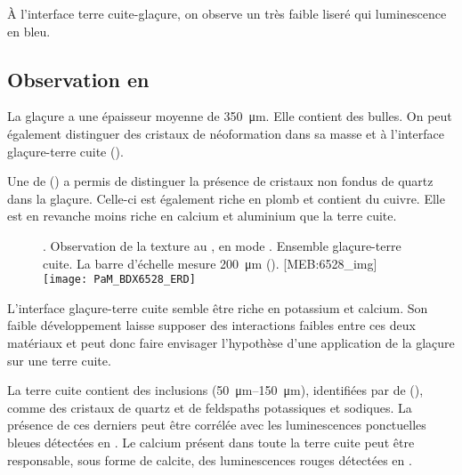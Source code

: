À l'interface terre cuite-glaçure, on observe un très faible liseré 
qui luminescence en bleu.

\subsection{Observation en \MEB[ie]}
La glaçure a une épaisseur moyenne de \SI{350}{\um}. Elle contient des 
bulles. On peut également distinguer des cristaux de néoformation dans 
sa masse et à l'interface glaçure-terre cuite 
().

Une \carto de \RX () a permis de distinguer 
la présence de cristaux non fondus de quartz dans la glaçure. Celle-ci 
est également riche en plomb et contient du cuivre. Elle est en 
revanche moins riche en calcium et aluminium que la terre cuite.

\begin{figure}[p]
  \setlength{\imgwidth}{7cm}
  \setlength{\mylength}{1cm+\imgwidth}
  \setlength{\sidecapwidth}{\linewidth-\sidecapsep-\mylength-1cm}
  \renewcommand*{\sidecapfloatwidth}{\mylength}%
  \RaggedLeft
  \begin{sidecaption}{%
    \legendeA.
    Observation de la texture au \MEB, en mode \ERD. 
    Ensemble glaçure-terre cuite. La barre d'échelle mesure 
    \SI{200}{\um} ().%
  }[MEB:6528_img]
    \texttt{[image: PaM\_BDX6528\_ERD]}%
  \end{sidecaption}
\end{figure}

L'interface glaçure-terre cuite semble être riche en potassium et 
calcium. Son faible développement laisse supposer des interactions 
faibles entre ces deux matériaux  et peut donc faire envisager 
l'hypothèse d'une application de la glaçure sur une terre cuite.

La terre cuite contient des inclusions 
(\SIrange[range-phrase=\ à\ ]{50}{150}{\um}), identifiées par \carto 
de \RX (), comme des cristaux de quartz et de 
feldspaths potassiques et sodiques. La présence de ces derniers peut 
être corrélée avec les luminescences ponctuelles bleues détectées en 
\CL. Le calcium présent dans toute la terre cuite peut être 
responsable, sous forme de calcite, des luminescences rouges détectées 
en \CL.

